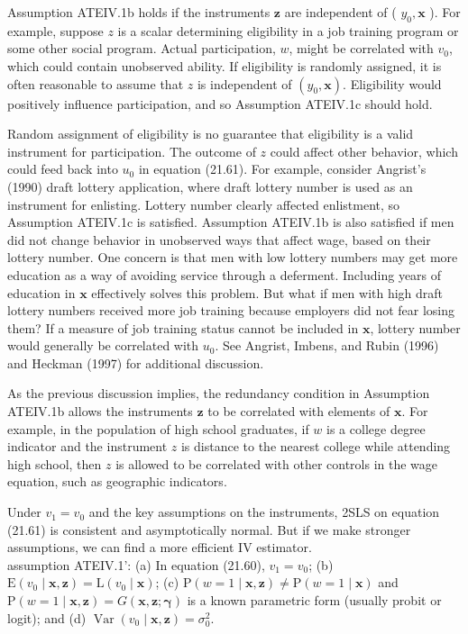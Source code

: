 \documentclass[10pt]{article}
\begin{document}
Assumption ATEIV.1b holds if the instruments $\mathbf{z}$ are independent of ( $y_{0}, \mathbf{x}$ ). For example, suppose $z$ is a scalar determining eligibility in a job training program or some other social program. Actual participation, $w$, might be correlated with $v_{0}$, which could contain unobserved ability. If eligibility is randomly assigned, it is often reasonable to assume that $z$ is independent of $\left(y_{0}, \mathbf{x}\right)$. Eligibility would positively influence participation, and so Assumption ATEIV.1c should hold.

Random assignment of eligibility is no guarantee that eligibility is a valid instrument for participation. The outcome of $z$ could affect other behavior, which could feed back into $u_{0}$ in equation (21.61). For example, consider Angrist's (1990) draft lottery application, where draft lottery number is used as an instrument for enlisting. Lottery number clearly affected enlistment, so Assumption ATEIV.1c is satisfied. Assumption ATEIV.1b is also satisfied if men did not change behavior in unobserved ways that affect wage, based on their lottery number. One concern is that men with low lottery numbers may get more education as a way of avoiding service through a deferment. Including years of education in $\mathbf{x}$ effectively solves this problem. But what if men with high draft lottery numbers received more job training because employers did not fear losing them? If a measure of job training status cannot be included in $\mathbf{x}$, lottery number would generally be correlated with $u_{0}$. See Angrist, Imbens, and Rubin (1996) and Heckman (1997) for additional discussion.

As the previous discussion implies, the redundancy condition in Assumption ATEIV.1b allows the instruments $\mathbf{z}$ to be correlated with elements of $\mathbf{x}$. For example, in the population of high school graduates, if $w$ is a college degree indicator and the instrument $z$ is distance to the nearest college while attending high school, then $z$ is allowed to be correlated with other controls in the wage equation, such as geographic indicators.

Under $v_{1}=v_{0}$ and the key assumptions on the instruments, 2SLS on equation (21.61) is consistent and asymptotically normal. But if we make stronger assumptions, we can find a more efficient IV estimator.\\
assumption ATEIV.1': (a) In equation (21.60), $v_{1}=v_{0}$; (b) $\mathrm{E}\left(v_{0} \mid \mathbf{x}, \mathbf{z}\right)=\mathrm{L}\left(v_{0} \mid \mathbf{x}\right)$; (c) $\mathrm{P}(w=1 \mid \mathbf{x}, \mathbf{z}) \neq \mathrm{P}(w=1 \mid \mathbf{x})$ and $\mathrm{P}(w=1 \mid \mathbf{x}, \mathbf{z})=G(\mathbf{x}, \mathbf{z} ; \boldsymbol{\gamma})$ is a known parametric form (usually probit or logit); and (d) $\operatorname{Var}\left(v_{0} \mid \mathbf{x}, \mathbf{z}\right)=\sigma_{0}^{2}$.
\end{document}
